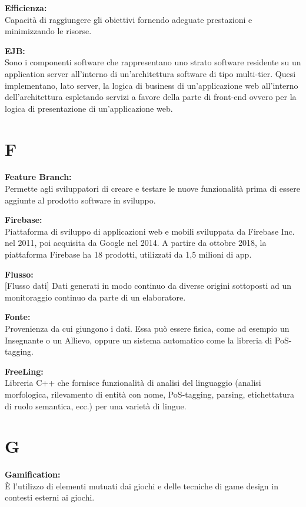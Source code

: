 \documentclass[a4paper, oneside, openany, dvipsnames, table]{article}
\begin{document}
\textbf{Efficienza:}\\ Capacità di raggiungere gli obiettivi fornendo adeguate prestazioni e minimizzando le risorse.

\textbf{EJB:}\\	Sono i componenti software che rappresentano uno strato software residente su un application server all'interno di un'architettura software di tipo multi-tier. Quesi implementano, lato server, la logica di business di un'applicazione web all'interno dell'architettura espletando servizi a favore della parte di front-end ovvero per la logica di presentazione di un'applicazione web.

\newpage
\section{F}
\textbf{Feature Branch:}\\	Permette agli sviluppatori di creare e testare le nuove funzionalità  prima di essere aggiunte al prodotto software in sviluppo.

\textbf{Firebase:}\\	Piattaforma di sviluppo di applicazioni web e mobili sviluppata da Firebase Inc. nel 2011, poi acquisita da Google nel 2014. A partire da ottobre 2018, la piattaforma Firebase ha 18 prodotti, utilizzati da 1,5 milioni di app.

\textbf{Flusso:}\\	{[}Flusso dati{]} Dati generati in modo continuo da diverse origini sottoposti ad un monitoraggio continuo da parte di un elaboratore.

\textbf{Fonte:}\\	Provenienza da cui giungono i dati. Essa può essere fisica, come ad esempio un Insegnante o un Allievo, oppure un sistema automatico come la libreria di PoS-tagging.

\textbf{FreeLing:}\\	Libreria C++ che fornisce funzionalità di analisi del linguaggio (analisi morfologica, rilevamento di entità con nome, PoS-tagging, parsing, etichettatura di ruolo semantica, ecc.) per una varietà di lingue.

\newpage
\section{G}

\textbf{Gamification:} \\  \`E l'utilizzo di elementi mutuati dai giochi e delle tecniche di game design in contesti esterni ai giochi.
\end{document}

